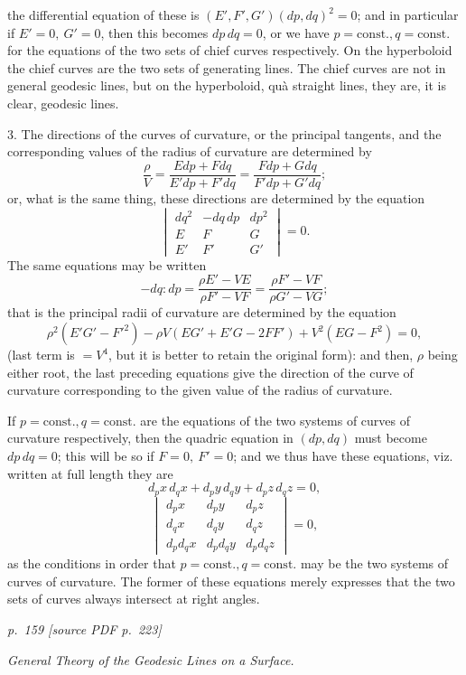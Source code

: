 \documentclass[11pt,a4paper]{article}
\newcommand{\sourcepage}[2]{%
  \bigskip
  \noindent\textit{p.~#1 [source PDF p.~#2]}%
  \par\smallskip
}
\newcommand{\qform}[2]{(#1)(#2)^2}
\begin{document}
the differential equation of these is \(\qform{E',F',G'}{dp,dq}=0\); and in particular
if \(E'=0,\ G'=0\), then this becomes \(dp\,dq=0\), or we have
\(p=\mathrm{const.}, q=\mathrm{const.}\) for the equations of the two sets of chief
curves respectively. On the hyperboloid the chief curves are the two sets of generating
lines. The chief curves are not in general geodesic lines, but on the hyperboloid,
qu\`a straight lines, they are, it is clear, geodesic lines.

3. The directions of the curves of curvature, or the principal tangents, and the
corresponding values of the radius of curvature are determined by
\[
\frac{\rho}{V}
=\frac{Edp+Fdq}{E'dp+F'dq}
=\frac{Fdp+Gdq}{F'dp+G'dq};
\]
or, what is the same thing, these directions are determined by the equation
\[
\begin{vmatrix}
dq^2&-dq\,dp&dp^2\\
E&F&G\\
E'&F'&G'
\end{vmatrix}=0.
\]
The same equations may be written
\[
-dq:dp=\frac{\rho E'-VE}{\rho F'-VF}
       =\frac{\rho F'-VF}{\rho G'-VG};
\]
that is the principal radii of curvature are determined by the equation
\[
\rho^2(E'G'-F'^2)-\rho V(EG'+E'G-2FF')+V^2(EG-F^2)=0,
\]
(last term is \(=V^4\), but it is better to retain the original form): and then,
\(\rho\) being either root, the last preceding equations give the direction of the
curve of curvature corresponding to the given value of the radius of curvature.

If \(p=\mathrm{const.}, q=\mathrm{const.}\) are the equations of the two systems of
curves of curvature respectively, then the quadric equation in \((dp,dq)\) must
become \(dp\,dq=0\); this will be so if \(F=0,\ F'=0\); and we thus have these
equations, viz. written at full length they are
\[
d_px\,d_qx+d_py\,d_qy+d_pz\,d_qz=0,
\]
\[
\begin{vmatrix}
d_px&d_py&d_pz\\
d_qx&d_qy&d_qz\\
d_pd_qx&d_pd_qy&d_pd_qz
\end{vmatrix}=0,
\]
as the conditions in order that \(p=\mathrm{const.}, q=\mathrm{const.}\) may be the
two systems of curves of curvature. The former of these equations merely expresses
that the two sets of curves always intersect at right angles.

\sourcepage{159}{223}

\begin{center}\itshape General Theory of the Geodesic Lines on a Surface.\end{center}
\end{document}
